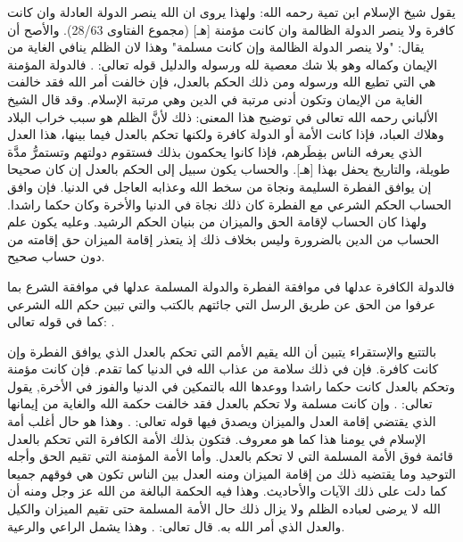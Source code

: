 يقول شيخ الإسلام ابن تمية رحمه الله:
ولهذا يروى ان الله ينصر الدولة العادلة وان كانت كافرة ولا ينصر الدولة الظالمة وان كانت مؤمنة
[هـ] {\footnotesize (مجموع الفتاوى 28/63)}.
والأصح أن يقال: "ولا ينصر الدولة الظالمة وإن كانت مسلمة" وهذا لان الظلم ينافي الغاية من الإيمان وكماله وهو بلا شك معصية لله ورسوله والدليل قوله تعالى:
\quranayah*[49][14]{\footnotesize \surahname*[49]}. فالدولة المؤمنة هي التي تطيع الله ورسوله ومن ذلك الحكم بالعدل، فإن خالفت أمر الله فقد خالفت الغاية من الإيمان وتكون أدنى مرتبة في الدين وهي مرتبة الإسلام.
وقد قال الشيخ الألباني رحمه الله تعالى في توضيح هذا المعنى:
ذلك لأنَّ الظلم هو سبب خراب البلاد وهلاك العباد، فإذا كانت الأمة أو الدولة كافرة ولكنها تحكم بالعدل فيما بينها، هذا العدل الذي يعرفه الناس بفِطَرهم، فإذا كانوا يحكمون بذلك فستقوم دولتهم وتستمرُّ مدَّة طويلة، والتاريخ يحفل بهذا
[هـ].
والحساب يكون سبيل إلى الحكم بالعدل إن كان صحيحا إن يوافق الفطرة السليمة ونجاة من سخط الله وعذابه العاجل في الدنيا. فإن وافق الحساب الحكم الشرعي مع الفطرة كان ذلك نجاة في الدنيا والأخرة وكان حكما راشدا. ولهذا كان الحساب لإقامة الحق والميزان من بنيان الحكم الرشيد. وعليه يكون علم الحساب من الدين بالضرورة وليس بخلاف ذلك إذ يتعذر إقامة الميزان حق إقامته من دون حساب صحيح.

فالدولة الكافرة عدلها في موافقة الفطرة والدولة المسلمة عدلها في موافقة الشرع بما عرفوا من الحق عن طريق الرسل التي جائتهم بالكتب والتي تبين حكم الله الشرعي كما في قوله تعالى:
\quranayah*[3][23]{\footnotesize \surahname*[3]}.

بالتتبع والإستقراء يتبين أن الله يقيم الأمم التي تحكم بالعدل الذي يوافق الفطرة وإن كانت كافرة. فإن في ذلك سلامة من عذاب الله في الدنيا كما تقدم. فإن كانت مؤمنة وتحكم بالعدل كانت حكما راشدا ووعدها الله بالتمكين في الدنيا والفوز في الأخرة, يقول تعالى:
\quranayah*[24][55]{\footnotesize \surahname*[24]}.
وإن كانت مسلمة ولا تحكم بالعدل فقد خالفت حكمة الله والغاية من إيمانها الذي يقتضي إقامة العدل والميزان ويصدق فيها قوله تعالى:
\quranayah*[49][14]{\footnotesize \surahname*[49]}. وهذا هو حال أغلب أمة الإسلام في يومنا هذا كما هو معروف. فتكون بذلك الأمة الكافرة التي تحكم بالعدل قائمة فوق الأمة المسلمة التي لا تحكم بالعدل. وأما الأمة المؤمنة التي تقيم الحق وأجله التوحيد وما يقتضيه ذلك من إقامة الميزان ومنه العدل بين الناس تكون هي فوقهم جميعا كما دلت على ذلك الآيات والأحاديث. وهذا فيه الحكمة البالغة من الله عز وجل ومنه أن الله لا يرضى لعباده الظلم ولا يزال ذلك حال الأمة المسلمة حتى تقيم الميزان والكيل والعدل الذي أمر الله به. قال تعالى:
\quranayah*[13][11][12]{\footnotesize \surahname*[13]}. وهذا يشمل الراعي والرعية.

